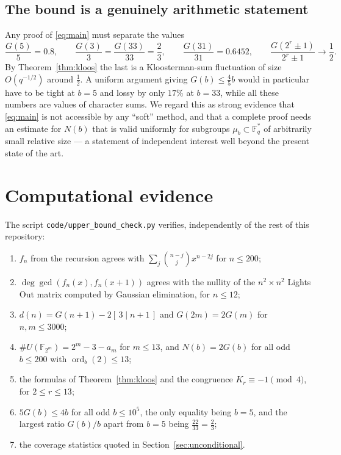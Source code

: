 \documentclass[a4paper]{article}
\theoremstyle{definition}
\newcommand{\F}{\mathbb{F}}
\begin{document}
	\subsection{The bound is a genuinely arithmetic statement}
	Any proof of \eqref{eq:main} must separate the values
	\begin{equation*}
		\frac{G(5)}{5} = 0.8, \qquad \frac{G(3)}{3} = \frac{G(33)}{33} = \frac23, \qquad \frac{G(31)}{31} = 0.6452, \qquad \frac{G(2^r\pm1)}{2^r \pm 1} \to \frac12 .
	\end{equation*}
	By Theorem~\ref{thm:kloos} the last is a Kloosterman-sum fluctuation of size $O(q^{-1/2})$ around $\frac12$.
	A uniform argument giving $G(b) \le \frac45 b$ would in particular have to be tight at $b = 5$ and lossy by only $17\%$ at $b = 33$, while all these numbers are values of character sums.
	We regard this as strong evidence that \eqref{eq:main} is not accessible by any ``soft'' method, and that a complete proof needs an estimate for $N(b)$ that is valid uniformly for subgroups $\mu_b \subset \F_q^*$ of arbitrarily small relative size --- a statement of independent interest well beyond the present state of the art.

	\section{Computational evidence}\label{sec:computation}
	The script \texttt{code/upper\_bound\_check.py} verifies, independently of the rest of this repository:
	\begin{enumerate}[label=(\arabic*)]
		\item $f_n$ from the recursion agrees with $\sum_j \binom{n-j}{j}x^{n-2j}$ for $n \le 200$;
		\item $\deg\gcd(f_n(x), f_n(x+1))$ agrees with the nullity of the $n^2 \times n^2$ Lights Out matrix computed by Gaussian elimination, for $n \le 12$;
		\item $d(n) = G(n+1) - 2[\,3\mid n+1\,]$ and $G(2m) = 2G(m)$ for $n, m \le 3000$;
		\item $\#U(\F_{2^m}) = 2^m - 3 - a_m$ for $m \le 13$, and $N(b) = 2G(b)$ for all odd $b \le 200$ with $\operatorname{ord}_b(2) \le 13$;
		\item the formulas of Theorem~\ref{thm:kloos} and the congruence $K_r \equiv -1 \pmod 4$, for $2 \le r \le 13$;
		\item $5G(b) \leq 4b$ for all odd $b \le 10^5$, the only equality being $b = 5$, and the largest ratio $G(b)/b$ apart from $b = 5$ being $\frac{22}{33} = \frac23$;
		\item the coverage statistics quoted in Section~\ref{sec:unconditional}.
	\end{enumerate}
\end{document}
